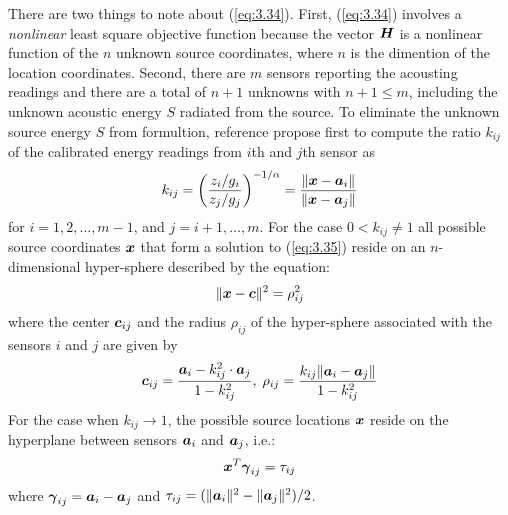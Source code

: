 There are two things to note about (\ref{eq:3.34}). First, (\ref{eq:3.34}) involves a \textit{nonlinear} least square objective function because the vector $\mbox{\boldmath$H$}$ is a nonlinear function of the $n$  unknown source coordinates, where $n$ is the dimention of the location coordinates. Second, there are $m$ sensors reporting the acousting readings and there are a total of $n + 1$ unknowns with  $n + 1 \leq m$, including the unknown acoustic energy $S$ radiated from the source. To eliminate the unknown source energy $S$ from formultion, reference \cite{ShengHu}  propose first to compute the ratio $k_{ij}$ of the calibrated energy readings from $i$th and $j$th sensor as
\begin{equation} \label{eq:3.35}
k_{ij} = \left( \frac{z_i / g_i}{z_j / g_j} \right)^{-1/\alpha} = \frac{\|\mbox{\boldmath$x$} - \mbox{\boldmath$a$}_i\|}{\|\mbox{\boldmath$x$} - \mbox{\boldmath$a$}_j\|}
\end{equation}
for $i = 1, 2, \ldots, m-1$, and $j = i+1, \ldots, m$. For the case $0 < k_{ij} \neq 1$ all possible source coordinates $\mbox{\boldmath$x$}$ that form a solution to (\ref{eq:3.35}) reside on an $n$-dimensional hyper-sphere described by the equation:
\begin{equation} \label{eq:3.36}
\| \mbox{\boldmath$x$} - \mbox{\boldmath$c$} \|^2 = \rho_{ij}^2
\end{equation}
where the center $\mbox{\boldmath$c$}_{ij}$ and the radius $\rho_{ij}$ of the hyper-sphere associated with the sensors $i$ and $j$  are given by
\begin{equation} \label{eq:3.37}
\mbox{\boldmath$c$}_{ij} = \frac{\mbox{\boldmath$a$}_i - k_{ij}^2\cdot\mbox{\boldmath$a$}_j}{1-k_{ij}^2}, \;
 \rho_{ij} = \frac{k_{ij}\|\mbox{\boldmath$a$}_i - \mbox{\boldmath$a$}_j\|}{1-k_{ij}^2}
\end{equation}
For the case when $k_{ij} \rightarrow 1$, the possible source locations $\mbox{\boldmath$x$}$ reside on the hyperplane between sensors $\mbox{\boldmath$a$}_i$ and $\mbox{\boldmath$a$}_j$, i.e.:
\begin{equation}
\nonumber
\mbox{\boldmath$x$}^T \mbox{\boldmath${\gamma}$}_{ij} = \tau_{ij}
\end{equation}
where $\mbox{\boldmath${\gamma}$}_{ij} = \mbox{\boldmath$a$}_i - \mbox{\boldmath$a$}_j$ and $\tau_{ij} = (\|\mbox{\boldmath$a$}_i\|^2 - \|\mbox{\boldmath$a$}_j\|^2) / 2$. 

